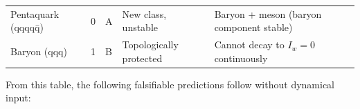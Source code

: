 \documentclass[12pt,a4paper]{article}
\begin{document}
\begin{longtable}[]{@{}lllll@{}}
\begin{minipage}[t]{0.17\columnwidth}\raggedright
Pentaquark (qqqqq̄)\strut
\end{minipage} & \begin{minipage}[t]{0.17\columnwidth}\raggedright
0\strut
\end{minipage} & \begin{minipage}[t]{0.17\columnwidth}\raggedright
A\strut
\end{minipage} & \begin{minipage}[t]{0.17\columnwidth}\raggedright
New class, unstable\strut
\end{minipage} & \begin{minipage}[t]{0.17\columnwidth}\raggedright
Baryon + meson (baryon component stable)\strut
\end{minipage}\tabularnewline
\begin{minipage}[t]{0.17\columnwidth}\raggedright
Baryon (qqq)\strut
\end{minipage} & \begin{minipage}[t]{0.17\columnwidth}\raggedright
1\strut
\end{minipage} & \begin{minipage}[t]{0.17\columnwidth}\raggedright
B\strut
\end{minipage} & \begin{minipage}[t]{0.17\columnwidth}\raggedright
Topologically protected\strut
\end{minipage} & \begin{minipage}[t]{0.17\columnwidth}\raggedright
Cannot decay to \(I_w = 0\) continuously\strut
\end{minipage}\tabularnewline
\bottomrule
\end{longtable}

From this table, the following falsifiable predictions follow without
dynamical input:
\end{document}
